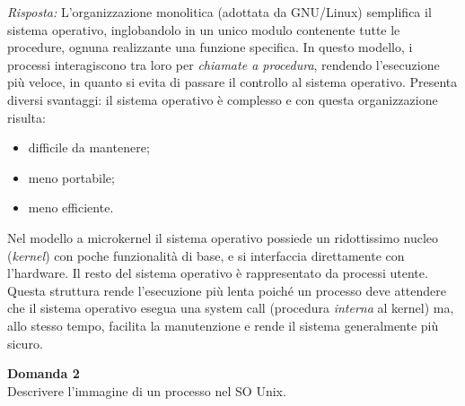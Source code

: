 \documentclass{article}
\newenvironment{problem}[2][Domanda]
    { \begin{mdframed}[backgroundcolor=gray!20] \textbf{#1 #2} \\}
    {  \end{mdframed}}
\newenvironment{solution}
    {\textit{Risposta:}}
    {}
\begin{document}
\begin{solution}
L’organizzazione monolitica (adottata da GNU/Linux) semplifica il sistema operativo, inglobandolo in un unico modulo contenente tutte le procedure, ognuna realizzante una funzione specifica.
\newline
In questo modello, i processi interagiscono tra loro per \textit{chiamate a procedura}, rendendo l’esecuzione più veloce, in quanto si evita di passare il controllo al sistema operativo.
\newline
\newline
Presenta diversi svantaggi: il sistema operativo è complesso e con questa organizzazione risulta:
\begin{itemize}
    \item difficile da mantenere;
    \item meno portabile;
    \item meno efficiente.
\end{itemize}
Nel modello a microkernel il sistema operativo possiede un ridottissimo nucleo (\textit{kernel}) con poche funzionalità di base, e si interfaccia direttamente con l’hardware.
\newline
Il resto del sistema operativo è rappresentato da processi utente.
\newline
Questa struttura rende l’esecuzione più lenta poiché un processo deve attendere che il sistema operativo esegua una system call (procedura \textit{interna} al kernel) ma, allo stesso tempo, facilita la manutenzione e rende il sistema generalmente più sicuro.
\end{solution}
\begin{problem}{2}
Descrivere l'immagine di un processo nel SO Unix. 
\end{problem}
\end{document}
